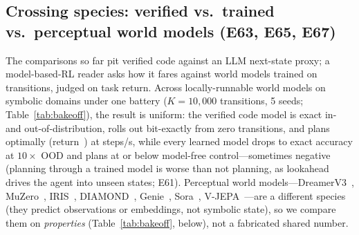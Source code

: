 \documentclass[11pt]{article}
\newcommand{\openworld}{\textsc{OpenWorld}}
\begin{document}
\subsection{Crossing species: verified vs.\ trained vs.\ perceptual world models (E63, E65, E67)}\label{sec:bakeoff}
The comparisons so far pit verified code against an LLM next-state proxy; a model-based-RL reader
asks how it fares against world models trained on transitions, judged on task return. Across
\BakeMethods{} locally-runnable world models on \BakeDomains{} symbolic domains under one battery
($K{=}10{,}000$ transitions, 5 seeds; Table~\ref{tab:bakeoff}), the result is uniform: the verified
code model is exact in- and out-of-distribution, rolls out bit-exactly from zero transitions,
and plans optimally (return~\BakeCodeReturn) at \BakeCodeSpeed{} steps/s, while every learned model
drops to \BakeLearnedOodMax{} exact accuracy at $10\times$ OOD and plans at or below model-free
control---sometimes negative (planning through a trained model is worse than not planning, as
lookahead drives the agent into unseen states; E61). Perceptual world
models---DreamerV3~\cite{dreamerv3}, MuZero~\cite{muzero}, IRIS~\cite{iris2023},
DIAMOND~\cite{diamond2024}, Genie~\cite{genie2024}, Sora~\cite{sora2024}, V-JEPA~\cite{vjepa2025}---are
a different species (they predict observations or embeddings, not symbolic state), so we
compare them on \emph{properties} (Table~\ref{tab:bakeoff}, below), not a fabricated shared number.

\begin{table}[htb]\centering\small

\caption{\textbf{World-model bake-off (E63).} Every world model we can run locally on shared
symbolic tasks (5 seeds, $K{=}10{,}000$). Verified code is the only model exact, OOD-robust,
optimal-for-control, auditable, and zero-data; perceptual models are a different species
(perceptual, not symbolic), positioned against \openworld{} in the introduction.}
\label{tab:bakeoff}
\end{table}
\end{document}
